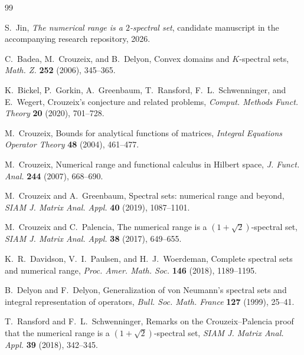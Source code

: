 \documentclass[11pt,oneside,openany]{book}
\theoremstyle{definition}
\theoremstyle{remark}
\begin{document}
\begin{thebibliography}{99}

S.~Jin,
\emph{The numerical range is a \(2\)-spectral set},
candidate manuscript in the accompanying research repository, 2026.

C.~Badea, M.~Crouzeix, and B.~Delyon,
Convex domains and \(K\)-spectral sets,
\emph{Math. Z.} \textbf{252} (2006), 345--365.

K.~Bickel, P.~Gorkin, A.~Greenbaum, T.~Ransford,
F.~L.~Schwenninger, and E.~Wegert,
Crouzeix's conjecture and related problems,
\emph{Comput. Methods Funct. Theory} \textbf{20} (2020), 701--728.

M.~Crouzeix,
Bounds for analytical functions of matrices,
\emph{Integral Equations Operator Theory} \textbf{48} (2004),
461--477.

M.~Crouzeix,
Numerical range and functional calculus in Hilbert space,
\emph{J. Funct. Anal.} \textbf{244} (2007), 668--690.

M.~Crouzeix and A.~Greenbaum,
Spectral sets: numerical range and beyond,
\emph{SIAM J. Matrix Anal. Appl.} \textbf{40} (2019), 1087--1101.

M.~Crouzeix and C.~Palencia,
The numerical range is a \((1+\sqrt2)\)-spectral set,
\emph{SIAM J. Matrix Anal. Appl.} \textbf{38} (2017), 649--655.

K.~R.~Davidson, V.~I.~Paulsen, and H.~J.~Woerdeman,
Complete spectral sets and numerical range,
\emph{Proc. Amer. Math. Soc.} \textbf{146} (2018), 1189--1195.

B.~Delyon and F.~Delyon,
Generalization of von Neumann's spectral sets and integral
representation of operators,
\emph{Bull. Soc. Math. France} \textbf{127} (1999), 25--41.

T.~Ransford and F.~L.~Schwenninger,
Remarks on the Crouzeix--Palencia proof that the numerical range is a
\((1+\sqrt2)\)-spectral set,
\emph{SIAM J. Matrix Anal. Appl.} \textbf{39} (2018), 342--345.

\end{thebibliography}
\end{document}
